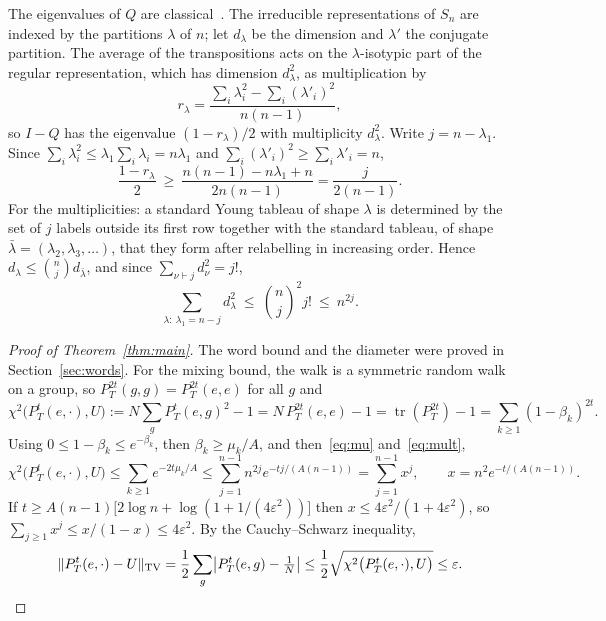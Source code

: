 \documentclass[11pt]{amsart}
\theoremstyle{remark}
\numberwithin{equation}{section}
\newcommand{\TV}{\mathrm{TV}}
\begin{document}
The eigenvalues of $Q$ are classical~\cite{DS81}. The irreducible representations of $S_n$ are indexed by the partitions $\lambda$ of $n$; let $d_\lambda$ be the dimension and $\lambda'$ the conjugate partition. The average of the transpositions acts on the $\lambda$-isotypic part of the regular representation, which has dimension $d_\lambda^2$, as multiplication by
\[
 r_\lambda=\frac{\sum_i\lambda_i^2-\sum_i(\lambda'_i)^2}{n(n-1)},
\]
so $I-Q$ has the eigenvalue $(1-r_\lambda)/2$ with multiplicity $d_\lambda^2$. Write $j=n-\lambda_1$. Since $\sum_i\lambda_i^2\le\lambda_1\sum_i\lambda_i=n\lambda_1$ and $\sum_i(\lambda'_i)^2\ge\sum_i\lambda'_i=n$,
\begin{equation}\label{eq:mu}
 \frac{1-r_\lambda}{2}\ \ge\ \frac{n(n-1)-n\lambda_1+n}{2n(n-1)}=\frac{j}{2(n-1)}.
\end{equation}
For the multiplicities: a standard Young tableau of shape $\lambda$ is determined by the set of $j$ labels outside its first row together with the standard tableau, of shape $\bar\lambda=(\lambda_2,\lambda_3,\dots)$, that they form after relabelling in increasing order. Hence $d_\lambda\le\binom nj d_{\bar\lambda}$, and since $\sum_{\nu\vdash j}d_\nu^2=j!$,
\begin{equation}\label{eq:mult}
 \sum_{\lambda:\ \lambda_1=n-j}d_\lambda^2\ \le\ \binom nj^2 j!\ \le\ n^{2j}.
\end{equation}

\begin{proof}[Proof of Theorem~\ref{thm:main}]
The word bound and the diameter were proved in Section~\ref{sec:words}. For the mixing bound, the walk is a symmetric random walk on a group, so $P_T^{2t}(g,g)=P_T^{2t}(e,e)$ for all $g$ and
\[
 \chi^2\bigl(P_T^t(e,\cdot),U\bigr):=N\sum_g P_T^t(e,g)^2-1=N\,P_T^{2t}(e,e)-1=\operatorname{tr}(P_T^{2t})-1=\sum_{k\ge1}(1-\beta_k)^{2t}.
\]
Using $0\le1-\beta_k\le e^{-\beta_k}$, then $\beta_k\ge\mu_k/A$, and then~\eqref{eq:mu} and~\eqref{eq:mult},
\[
 \chi^2\bigl(P_T^t(e,\cdot),U\bigr)\le\sum_{k\ge1}e^{-2t\mu_k/A}\le\sum_{j=1}^{n-1}n^{2j}e^{-tj/(A(n-1))}=\sum_{j=1}^{n-1}x^j,\qquad x=n^2e^{-t/(A(n-1))}.
\]
If $t\ge A(n-1)\bigl[2\log n+\log(1+1/(4\varepsilon^2))\bigr]$ then $x\le 4\varepsilon^2/(1+4\varepsilon^2)$, so $\sum_{j\ge1}x^j\le x/(1-x)\le 4\varepsilon^2$. By the Cauchy--Schwarz inequality,
\[
 \|P_T^t(e,\cdot)-U\|_{\TV}=\frac12\sum_g\bigl|P_T^t(e,g)-\tfrac1N\bigr|\le\frac12\sqrt{\chi^2\bigl(P_T^t(e,\cdot),U\bigr)}\le\varepsilon.\qedhere
\]
\end{proof}
\end{document}
